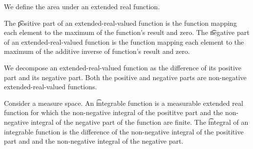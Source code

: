 
\sbasic









































\sstart
{}


We define the area under an extended real function.


The \t{positive part} of an extended-real-valued function is the function mapping each element to the maximum of the function's result and zero.
The \t{negative part} of an extended-real-valued function is the function mapping each element to the maximum of the additive inverse of function's result and zero.

We decompose an extended-real-valued function as the difference of its positive part and its negative part.
Both the positive and negative parts are non-negative extended-real-valued functions.

Consider a measure space.
An \t{integrable} function is a measurable extended real function for which the non-negative integral of the posititve part and the non-negative integral of the negative part of the function are finite.
The \t{integral} of an integrable function is the difference of the non-negative integral of the posititive part and and the non-negative integral of the negative part.

